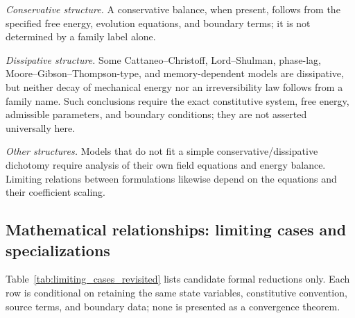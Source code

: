\emph{Conservative structure.} A conservative balance, when present, follows from the specified free energy, evolution equations, and boundary terms; it is not determined by a family label alone.

\emph{Dissipative structure.} Some Cattaneo--Christoff, Lord--Shulman, phase-lag, Moore--Gibson--Thompson-type, and memory-dependent models are dissipative, but neither decay of mechanical energy nor an irreversibility law follows from a family name. Such conclusions require the exact constitutive system, free energy, admissible parameters, and boundary conditions; they are not asserted universally here.

\emph{Other structures.} Models that do not fit a simple conservative/dissipative dichotomy require analysis of their own field equations and energy balance. Limiting relations between formulations likewise depend on the equations and their coefficient scaling.

\subsection{Mathematical relationships: limiting cases and specializations}
\label{sec:12.3}

Table~\ref{tab:limiting_cases_revisited} lists candidate formal reductions only. Each row is conditional on retaining the same state variables, constitutive convention, source terms, and boundary data; none is presented as a convergence theorem.


